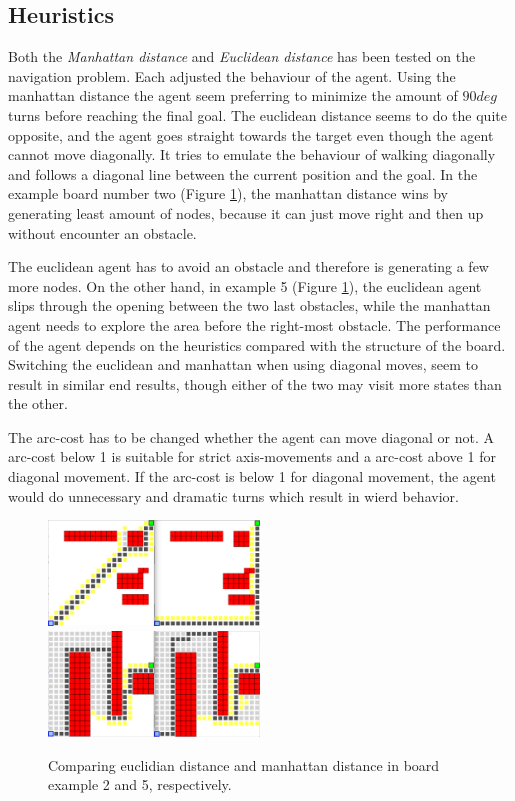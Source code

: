 \subsection{Heuristics}
Both the \emph{Manhattan distance} and \emph{Euclidean distance} has been tested on the navigation problem. Each adjusted the behaviour of the agent. Using the manhattan distance the agent seem preferring to minimize the amount of \(90 deg\) turns before reaching the final goal. The euclidean distance seems to do the quite opposite, and the agent goes straight towards the target even though the agent cannot move diagonally. It tries to emulate the behaviour of walking diagonally and follows a diagonal line between the current position and the goal. In the example board number two (Figure \ref{run:examples}), the manhattan distance wins by generating least amount of nodes, because it can just move right and then up without encounter an obstacle. 

The euclidean agent has to avoid an obstacle and therefore is generating a few more nodes. On the other hand, in example 5 (Figure \ref{run:examples}), the euclidean agent slips through the opening between the two last obstacles, while the manhattan agent needs to explore the area before the right-most obstacle. The performance of the agent depends on the heuristics compared with the structure of the board. Switching the euclidean and manhattan when using diagonal moves, seem to result in similar end results, though either of the two may visit more states than the other.

The arc-cost has to be changed whether the agent can move diagonal or not. A arc-cost below 1 is suitable for strict axis-movements and a arc-cost above 1 for diagonal movement. If the arc-cost is below 1 for diagonal movement, the agent would do unnecessary and dramatic turns which result in wierd behavior.

\begin{figure}[h!]
	\centering
	\begin{minipage}{\textwidth}
		\includegraphics[width=0.5\textwidth]{module_1/images/run_ex2}
		\includegraphics[width=0.5\textwidth]{module_1/images/run_ex5}
	\end{minipage}
	\caption{Comparing euclidian distance and manhattan distance in board example 2 and 5, respectively.}
	\label{run:examples}
\end{figure}


